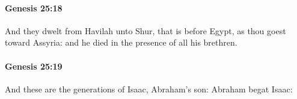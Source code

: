 		\paragraph{Genesis 25:18} %
			\label{GENESIS-25-18}

			And they dwelt from Havilah unto Shur, that is before Egypt, as thou goest toward Assyria: and he died in the presence of all his brethren.


		\paragraph{Genesis 25:19} %
			\label{GENESIS-25-19}

			And these are the generations of Isaac, Abraham's son: Abraham begat Isaac:


